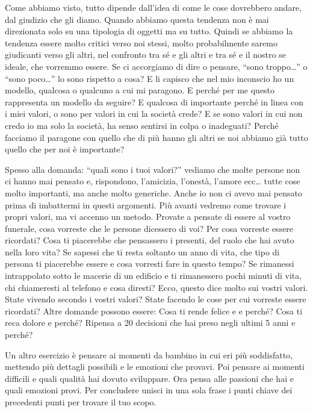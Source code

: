 \documentclass[12pt]{book} %
\begin{document}
Come abbiamo visto, tutto dipende dall'idea di come le cose dovrebbero andare, dal giudizio che gli
diamo. Quando abbiamo questa tendenza non è mai direzionata solo su una tipologia di oggetti ma su tutto. Quindi se
abbiamo la tendenza essere molto critici verso noi stessi, molto probabilmente saremo giudicanti verso gli altri, nel
confronto tra sé e gli altri e tra sé e il nostro se ideale, che vorremmo essere. Se ci accorgiamo di dire o pensare,
“sono troppo…” o “sono poco…” lo sono rispetto a cosa? E li capisco che nel mio inconscio ho un modello, qualcosa o
qualcuno a cui mi paragono. E perché per me questo rappresenta un modello da seguire? E qualcosa di importante perché
in linea con i miei valori, o sono per valori in cui la società crede? E se sono valori in cui non credo io ma solo la
società, ha senso sentirsi in colpa o inadeguati? Perché facciamo il paragone con quello che di più hanno gli altri se
noi abbiamo già tutto quello che per noi è importante?

Spesso alla domanda: “quali sono i tuoi valori?” vediamo che molte persone non ci hanno mai pensato e, rispondono,
l'amicizia, l'onestà, l'amore ecc… tutte cose molto
importanti, ma anche molto generiche. Anche io non ci avevo mai pensato prima di imbattermi in questi argomenti. Più
avanti vedremo come trovare i propri valori, ma vi accenno un metodo. Provate a pensate di essere al vostro funerale,
cosa vorreste che le persone dicessero di voi? Per cosa vorreste essere ricordati? Cosa ti piacerebbe che pensassero i
presenti, del ruolo che hai avuto nella loro vita? Se sapessi che ti resta soltanto un anno di vita, che tipo di
persona ti piacerebbe essere e cosa vorresti fare in questo tempo? Se rimanessi intrappolato sotto le macerie di un
edificio e ti rimanessero pochi minuti di vita, chi chiameresti al telefono e cosa diresti? Ecco, questo dice molto sui
vostri valori. State vivendo secondo i vostri valori? State facendo le cose per cui vorreste essere ricordati?
Altre domande possono essere:
Cosa ti rende felice e e perché?
Cosa ti reca dolore e perché?
Ripensa a 20 decisioni che hai preso negli ultimi 5 anni e perché?

Un altro esercizio è pensare ai momenti da bambino in cui eri più soddisfatto, mettendo più dettagli possibili e le
emozioni che provavi. Poi pensare ai momenti difficili e quali qualità hai dovuto sviluppare. Ora pensa alle passioni
che hai e quali emozioni provi. Per concludere unisci in una sola frase i punti chiave dei precedenti punti per trovare
il tuo scopo.
\end{document}
